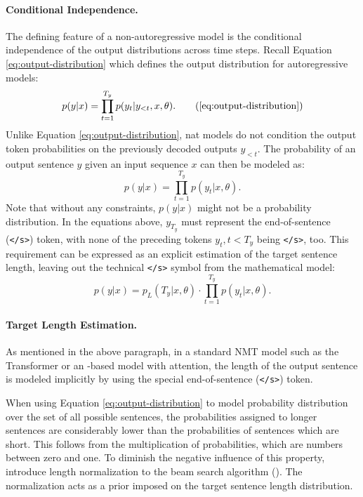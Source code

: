 \paragraph{Conditional Independence.} The defining feature of a
non-autoregressive model is the conditional independence of the output
distributions across time steps. Recall Equation \ref{eq:output-distribution}
which defines the output distribution for autoregressive models:
%
\begin{equation}
  p(y|x) = \prod_{t=1}^{T_y}p(y_t|y_{<t},x,\theta).
  \tag{\ref{eq:output-distribution}}
\end{equation}
%
Unlike Equation \ref{eq:output-distribution}, \Gls{nat} models do not condition
the output token probabilities on the previously decoded outputs $y_{<t}$.  The
probability of an output sentence $y$ given an input sequence $x$ can then be
modeled as:
%
\begin{equation}
  p(y|x) = \prod_{t=1}^{T_y}p(y_t|x,\theta).
  \label{eq:nat-output-distribution}
\end{equation}
%
Note that without any constraints, $p(y|x)$ might not be a probability
distribution. In the equations above, $y_{T_y}$ must represent the
end-of-sentence (\texttt{</s>}) token, with none of the preceding tokens
$y_t, t < T_y$ being \texttt{</s>}, too. This requirement can be expressed as an
explicit estimation of the target sentence length, leaving out the technical
\texttt{</s>} symbol from the mathematical model:
\begin{equation}
  p(y|x) = p_L(T_y|x, \theta) \cdot \prod_{t=1}^{T_y}p(y_t|x,\theta).
  \label{eq:explicit-length}
\end{equation}

\paragraph{Target Length Estimation.} As mentioned in the above paragraph, in a
standard NMT model such as the Transformer or an -based model
with attention, the length of the output sentence is modeled implicitly by
using the special end-of-sentence (\texttt{</s>}) token. 

When using Equation \ref{eq:output-distribution} to model probability
distribution over the set of all possible sentences, the probabilities assigned
to longer sentences are considerably lower than the probabilities of sentences
which are short. This follows from the multiplication of probabilities, which
are numbers between zero and one.    To diminish the negative influence of this property,
\citet{wu2016google} introduce length normalization to the beam search algorithm
(). The normalization acts as a prior imposed
on the target sentence length distribution.

